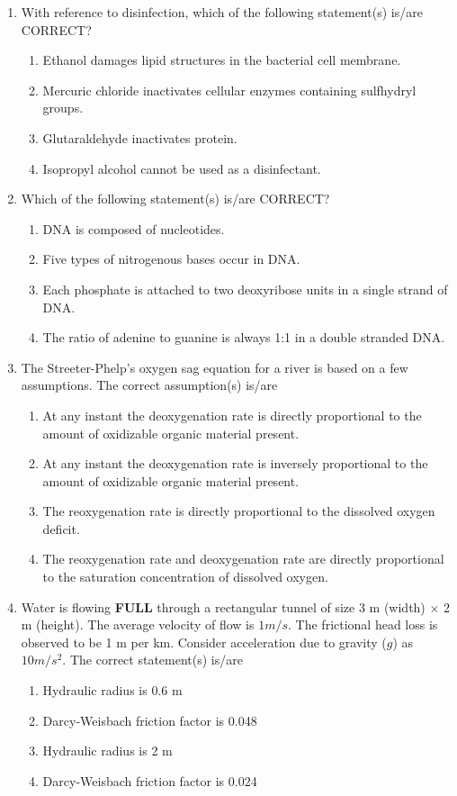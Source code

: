 \documentclass[journal]{IEEEtran}
\begin{document}
\begin{enumerate}
\item With reference to disinfection, which of the following statement(s) is/are {CORRECT}?
\hfill{}
\begin{enumerate}
\item Ethanol damages lipid structures in the bacterial cell membrane.
\item Mercuric chloride inactivates cellular enzymes containing sulfhydryl groups.
\item Glutaraldehyde inactivates protein.
\item Isopropyl alcohol cannot be used as a disinfectant.
\end{enumerate}

\item Which of the following statement(s) is/are CORRECT?
\hfill{}
\begin{enumerate}
\item DNA is composed of nucleotides.
\item Five types of nitrogenous bases occur in DNA.
\item Each phosphate is attached to two deoxyribose units in a single strand of DNA.
\item The ratio of adenine to guanine is always 1:1 in a double stranded DNA.
\end{enumerate}

\item The Streeter-Phelp's oxygen sag equation for a river is based on a few assumptions. The correct assumption(s) is/are
\hfill{}
\begin{enumerate}
\item At any instant the deoxygenation rate is directly proportional to the amount of oxidizable organic material present.
\item At any instant the deoxygenation rate is inversely proportional to the amount of oxidizable organic material present.
\item The reoxygenation rate is directly proportional to the dissolved oxygen deficit.
\item The reoxygenation rate and deoxygenation rate are directly proportional to the saturation concentration of dissolved oxygen.
\end{enumerate}

\item Water is flowing \textbf{FULL} through a rectangular tunnel of size 3 m (width) $\times$ 2 m (height). The average velocity of flow is $1 m/s.$ The frictional head loss is observed to be 1 m per km. Consider acceleration due to gravity ($g$) as $10 m/s^2$. The correct statement(s) is/are
\hfill{}
\begin{enumerate}
\item Hydraulic radius is 0.6 m
\item Darcy-Weisbach friction factor is 0.048
\item Hydraulic radius is 2 m
\item Darcy-Weisbach friction factor is 0.024
\end{enumerate}


\end{enumerate}
\end{document}
